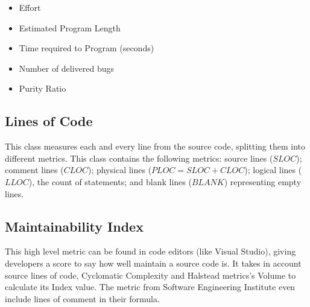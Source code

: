 \begin{itemize}
\begin{description}
        \end{description}
  \item Effort 
  \item Estimated Program Length 
  \item Time required to Program (seconds) 
  \item Number of delivered bugs 
  \item Purity Ratio 
\end{itemize}

\subsection{Lines of Code}

This class measures each and every line from the source code, splitting them into different metrics.
This class contains the following metrics: source lines ($SLOC$); comment lines ($CLOC$); physical lines ($PLOC = SLOC + CLOC$);
logical lines ($LLOC$), the count of statements; and blank lines ($BLANK$) representing empty lines.

\subsection{Maintainability Index}

This high level metric can be found in code editors (like Visual Studio), giving developers a score to say how well maintain
a source code is. It takes in account source lines of code, Cyclomatic Complexity and Halstead metrics's Volume to calculate its Index value.
The metric from Software Engineering Institute even include lines of comment in their formula.

